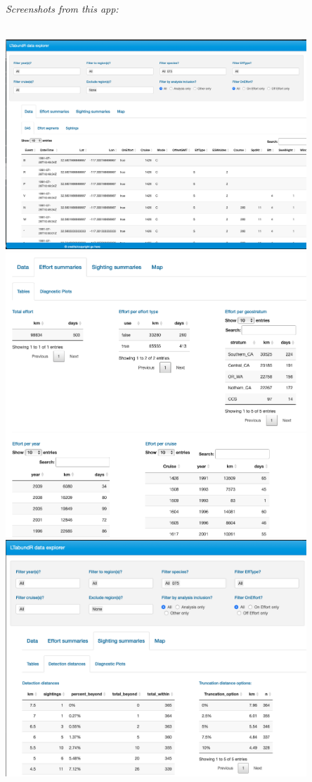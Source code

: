\documentclass[
]{book}
\begin{document}
\emph{Screenshots from this app:}

~\\

\includegraphics[width=0.85\textwidth,height=\textheight]{img/app-1.png}
~\\
\includegraphics[width=0.85\textwidth,height=\textheight]{img/app-2.png}
~\\
\includegraphics[width=0.85\textwidth,height=\textheight]{img/app-3.png}
\end{document}
